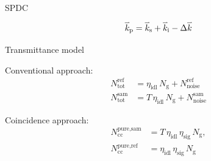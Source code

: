 \documentclass[10pt,aspectratio=43]{beamer}
\newcommand{\myvect}[1]{\accentset{\rightharpoonup}{#1}}
\begin{document}
\begin{frame}{SPDC}
\begin{figure}
\begin{minipage}{.4\textwidth}
\begin{center}
{
				}%
			\end{center}
			\begin{equation}
					\myvect{k}_{\text{p}} = \myvect{k}_{\text{s}} + 	\myvect{k}_{\text{i}} - 	\Delta \myvect{k}
				\nonumber
			\end{equation} 
		\end{minipage}
					
		\end{figure}
	\end{frame}
	
	\begin{frame}{Transmittance model}
		\begin{minipage}{.4\textwidth}
			\centering
			Conventional approach:
			\begin{equation}
				\begin{aligned}
					N_{\text{tot}}^{\text{ref}} &= \eta_{\text{idl}} \, N_{\mathrm{g}} 	+ N_{\text{noise}}^{\text{ref}} \\[0.5em]
					N_{\text{tot}}^{\text{sam}} &= T \, \eta_{\text{idl}} \, 	N_{\mathrm{g}} + N_{\text{noise}}^{\text{sam}}
				\end{aligned}
				\label{eq:SingleSam}
				\nonumber
			\end{equation}
		\end{minipage}
		\hfill
		\begin{minipage}{.4\textwidth}
			\centering
			Coincidence approach:
			\begin{equation}
				\begin{aligned}
					N_{\text{cc}}^{\text{pure,sam}} &= T \,\eta_{\text{idl}} \,\eta_{\text{sig}} \, N_{\mathrm{g}}, \\[0.5em]
					N_{\text{cc}}^{\text{pure,ref}} &= \eta_{\text{idl}} \,\eta_{\text{sig}} \, N_{\mathrm{g}}
				\end{aligned}
				\label{eq:pureCoinc}
				\nonumber
			\end{equation}
		\end{minipage}
	\end{frame}
	
\end{document}
